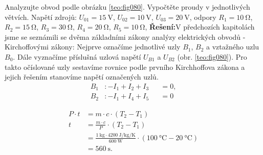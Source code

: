 \begin{mdframed}[style=mdexam]
  \begin{example}\label{TEO:exam020}
    Analyzujte obvod podle obrázku \ref{teo:fig080}. Vypočtěte proudy v jednotlivých větvích. Napětí
    zdrojů: \(U_{01} = \SI{15}{\V}\), \(U_{02} = \SI{10}{\V}\), \(U_{03} = \SI{20}{\V}\), odpory
    \(R_1 = \SI{10}{\ohm}\), \(R_2 = \SI{15}{\ohm}\), \(R_3 = \SI{30}{\ohm}\), \(R_4 =
    \SI{20}{\ohm}\), \(R_5 = \SI{10}{\ohm}\),
    \newline 
    \textbf{Řešení:}\newline V předchozích kapitolách jsme se seznámili se dvěma základními zákony
    analýzy elektrických obvodů - Kirchoffovými zákony: Nejprve označíme jednotlivé uzly \(B_1\), \(B_2\) a vztažného uzlu \(B_0\). Dále
    vyznačíme příslušná uzlová napětí \(U_{B1}\) a \(U_{B2}\) (obr. \ref{teo:fig080}). Pro takto
    očíslované uzly sestavíme rovnice podle prvního Kirchhoffova zákona a jejich řešením stanovíme
    napětí označených uzlů.
    \begin{subequations}\label{teo:eq149}
      \begin{alignat}{2}
        B_1&: -I_1 + I_2 + I_3 &&=0,  \label{teo:eq149a}   \\
        B_2&: -I_1 + I_4 + I_5 &&=0   \label{teo:eq149b} 
      \end{alignat}
    \end{subequations}  
    
    {\centering
    \captionsetup{type=figure}
    \label{teo:fig080}
    \par}

    \begin{align*}
      P\cdot t &= m\cdot c\cdot(T_2 - T_1)                                               \\
             t &= \frac{m\cdot c}{P}\cdot(T_2 - T_1)                                     \\     
               &= \frac{\SI{1}{\kg}\cdot\SI{4200}{\joule\per\kg\per\K}}{\SI{600}{\W}}
                \cdot(\SI{100}{\degreeCelsius} - \SI{20}{\degreeCelsius})                \\ 
               &= \SI{560}{\s}.
    \end{align*}         
  \end{example}
\end{mdframed}